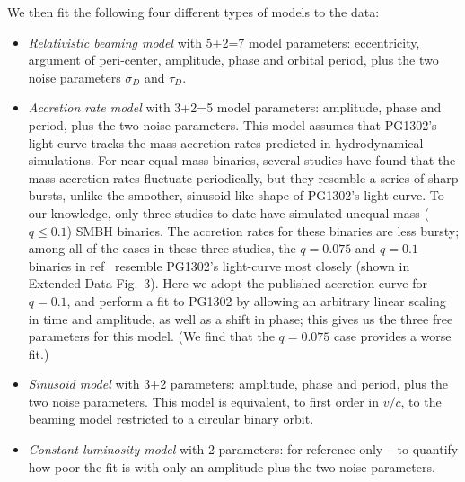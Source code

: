 We then fit the following four different types of models to the data:
%
\begin{itemize}
\item {\it Relativistic beaming model} with 5+2=7 model parameters:
  eccentricity, argument of peri-center, amplitude, phase and orbital
  period, plus the two noise parameters $\sigma_D$ and $\tau_D$.
\item {\it Accretion rate model} with 3+2=5 model parameters:
  amplitude, phase and period, plus the two noise parameters.  This
  model assumes that PG1302's light-curve tracks the mass accretion
  rates predicted in hydrodynamical simulations.  For near-equal mass
  binaries, several studies have found that the mass accretion rates
  fluctuate periodically, but they resemble a series of sharp bursts,
  unlike the smoother, sinusoid-like shape of PG1302's light-curve.
  To our knowledge, only three studies to date have simulated
  unequal-mass ($q\leq 0.1$) SMBH
  binaries\cite{Dorazio+2013,Farris+2014,ShiKrolik2015}. The accretion
  rates for these binaries are less bursty; among all of the cases in
  these three studies, the $q=0.075$ and $q=0.1$ binaries in
  ref~\cite{Dorazio+2013} resemble PG1302's light-curve most closely
  (shown in Extended Data Fig.~3).  Here we adopt the published
  accretion curve for $q=0.1$, and perform a fit to PG1302 by
  allowing an arbitrary linear scaling in time and amplitude, as well
  as a shift in phase; this gives us the three free parameters for
  this model.  (We find that the $q=0.075$ case provides a worse fit.)
\item {\it Sinusoid model} with 3+2 parameters: amplitude, phase and
  period, plus the two noise parameters. This model is equivalent, to
  first order in $v/c$, to the beaming model restricted to a circular
  binary orbit.
\item {\it Constant luminosity model} with 2 parameters: for
  reference only -- to quantify how poor the fit is with only an
  amplitude plus the two noise parameters.

\end{itemize}
%

